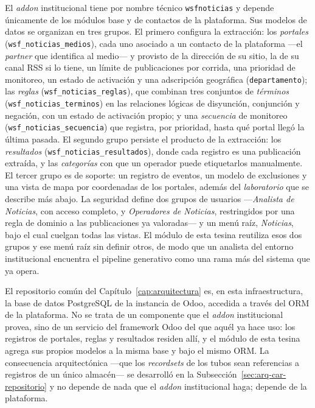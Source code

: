 \documentclass[12pt]{report}
\begin{document}
El \textit{addon} institucional tiene por nombre técnico \texttt{wsfnoticias} y depende únicamente de los módulos base y de contactos de la plataforma. Sus modelos de datos se organizan en tres grupos. El primero configura la extracción: los \textit{portales} (\texttt{wsf\_noticias\_medios}), cada uno asociado a un contacto de la plataforma ---el \textit{partner} que identifica al medio--- y provisto de la dirección de su sitio, la de su canal RSS si lo tiene, un límite de publicaciones por corrida, una prioridad de monitoreo, un estado de activación y una adscripción geográfica (\texttt{departamento}); las \textit{reglas} (\texttt{wsf\_noticias\_reglas}), que combinan tres conjuntos de \textit{términos} (\texttt{wsf\_noticias\_terminos}) en las relaciones lógicas de disyunción, conjunción y negación, con un estado de activación propio; y una \textit{secuencia} de monitoreo (\texttt{wsf\_noticias\_secuencia}) que registra, por prioridad, hasta qué portal llegó la última pasada. El segundo grupo persiste el producto de la extracción: los \textit{resultados} (\texttt{wsf\_noticias\_resultados}), donde cada registro es una publicación extraída, y las \textit{categorías} con que un operador puede etiquetarlos manualmente. El tercer grupo es de soporte: un registro de eventos, un modelo de exclusiones y una vista de mapa por coordenadas de los portales, además del \textit{laboratorio} que se describe más abajo. La seguridad define dos grupos de usuarios ---\textit{Analista de Noticias}, con acceso completo, y \textit{Operadores de Noticias}, restringidos por una regla de dominio a las publicaciones ya valoradas--- y un menú raíz, \textit{Noticias}, bajo el cual cuelgan todas las vistas. El módulo de esta tesina reutiliza esos dos grupos y ese menú raíz sin definir otros, de modo que un analista del entorno institucional encuentra el pipeline generativo como una rama más del sistema que ya opera.

El repositorio común del Capítulo~\ref{cap:arquitectura} es, en esta infraestructura, la base de datos PostgreSQL de la instancia de Odoo, accedida a través del ORM de la plataforma. No se trata de un componente que el \textit{addon} institucional provea, sino de un servicio del framework Odoo del que aquél ya hace uso: los registros de portales, reglas y resultados residen allí, y el módulo de esta tesina agrega sus propios modelos a la misma base y bajo el mismo ORM. La consecuencia arquitectónica ---que los \textit{recordsets} de los tubos sean referencias a registros de un único almacén--- se desarrolló en la Subsección~\ref{sec:arq-car-repositorio} y no depende de nada que el \textit{addon} institucional haga; depende de la plataforma.
\end{document}
